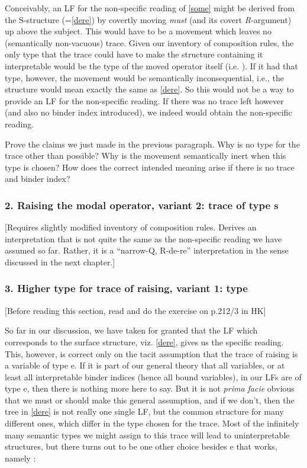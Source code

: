 Conceivably, an LF for the non-specific reading of \ref{some} might be derived from the S-structure (=\ref{dere}) by covertly moving \emph{must} (and its covert \emph{R}-argument) up above the subject. This would have to be a movement which leaves no (semantically non-vacuous) trace. Given our inventory of composition rules, the only type that the trace could have to make the structure containing it interpretable would be the type of the moved operator itself (i.e. ). If it had that type, however, the movement would be semantically inconsequential, i.e., the structure would mean exactly the same as \ref{dere}. So this would not be a way to provide an LF for the non-specific reading. If there was no trace left however (and also no binder index introduced), we indeed would obtain the non-specific reading.
\begin{exercise}
	Prove the claims we just made in the previous paragraph. Why is no type for the trace other than  possible? Why is the movement semantically inert when this type is chosen? How does the correct intended meaning arise if there is no trace and binder index? \eex 
\end{exercise}

\subsubsection{2. Raising the modal operator, variant 2: trace of type s}

[Requires slightly modified inventory of composition rules. Derives an
interpretation that is not quite the same as the non-specific
reading we have assumed so far. Rather, it is a ``narrow-Q, R-de-re''
interpretation in the sense discussed in the next chapter.]

\subsubsection{3. Higher type for trace of raising, variant 1: type  }

[Before reading this section, read and do the exercise on p.212/3 in H\amp K]

\absatz So far in our discussion, we have taken for granted that the LF which corresponds to the surface structure, viz. \ref{dere}, gives us the specific reading. This, however, is correct only on the tacit assumption that the trace of raising is a variable of type e. If it is part of our general theory that all variables, or at least all interpretable binder indices (hence all bound variables), in our LFs are of type e, then there is nothing more here to say. But it is not \emph{prima facie} obvious that we must or should make this general assumption, and if we don't, then the tree in \ref{dere} is not really one single LF, but the common structure for many different ones, which differ in the type chosen for the trace. Most of the infinitely many semantic types we might assign to this trace will lead to uninterpretable structures, but there turns out to be one other choice besides e that works, namely :

